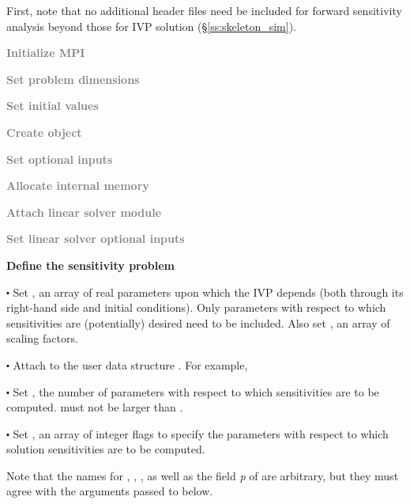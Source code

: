 First, note that no additional header files need be included for forward sensitivity 
analysis beyond those for IVP solution (\S\ref{ss:skeleton_sim}).
\begin{Steps}
  
\item 
  \textcolor{gray}{\bf {\p} Initialize MPI}

\item
  \textcolor{gray}{\bf Set problem dimensions}

\item
  \textcolor{gray}{\bf Set initial values}
 
\item
  \textcolor{gray}{\bf Create {\cvodes} object}

\item
  \textcolor{gray}{\bf Set optional inputs}

\item
  \textcolor{gray}{\bf Allocate internal memory}

\item
  \textcolor{gray}{\bf Attach linear solver module}

\item
  \textcolor{gray}{\bf Set linear solver optional inputs}

\item \label{i:fwd_start}
  {\bf Define the sensitivity problem}

  $\centerdot$ Set , an array of  real parameters upon which the IVP depends 
  (both through its right-hand side and initial conditions). Only parameters
  with respect to which sensitivities are (potentially) desired need to 
  be included. Also set , an array of  scaling factors.
  
  $\centerdot$ Attach  to the user data structure . 
  For example, 
  
  $\centerdot$ Set , the number of parameters with respect to which sensitivities
  are to be computed.  must not be larger than .
  
  $\centerdot$ Set , an array of  integer flags to specify the parameters
   with respect to which solution sensitivities are to be computed.
  
  Note that the names for , , , as well as the field
  {\em p} of  are arbitrary, but they must agree with the arguments
  passed to  below.


\end{Steps}
